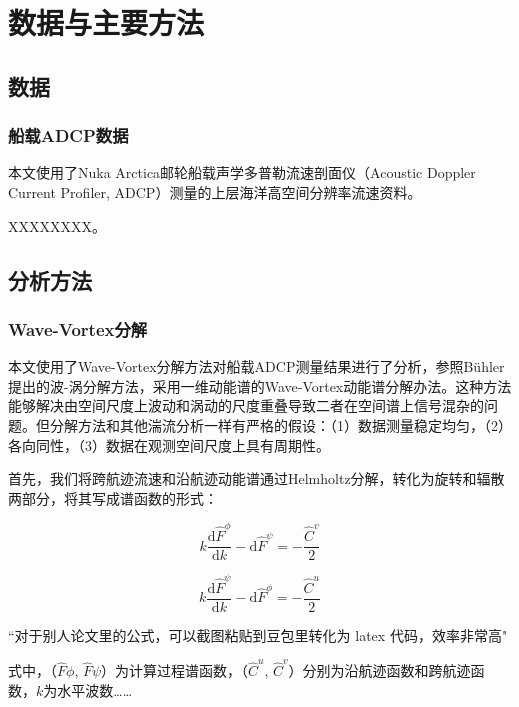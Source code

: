 \chapter{数据与主要方法}

\section{数据}

\subsection{船载ADCP数据}

本文使用了Nuka Arctica邮轮船载声学多普勒流速剖面仪（Acoustic Doppler Current Profiler, ADCP）测量的上层海洋高空间分辨率流速资料。

XXXXXXXX。

\section{分析方法}

\subsection{Wave-Vortex分解}

本文使用了Wave-Vortex分解方法对船载ADCP测量结果进行了分析，参照Bühler提出的波-涡分解方法，采用一维动能谱的Wave-Vortex动能谱分解办法。这种方法能够解决由空间尺度上波动和涡动的尺度重叠导致二者在空间谱上信号混杂的问题。但分解方法和其他湍流分析一样有严格的假设：（1）数据测量稳定均匀，（2）各向同性，（3）数据在观测空间尺度上具有周期性。

首先，我们将跨航迹流速和沿航迹动能谱通过Helmholtz分解，转化为旋转和辐散两部分，将其写成谱函数的形式：

\begin{equation}
k\frac{\mathrm{d}\widehat{F}^{\phi}}{\mathrm{d}k}-\mathrm{d}\widehat{F}^{\psi}=-\frac{\widehat{C}^{v}}{2}
\end{equation}

\begin{equation}
k\frac{\mathrm{d}\widehat{F}^{\psi}}{\mathrm{d}k}-\mathrm{d}\widehat{F}^{\phi}=-\frac{\widehat{C}^{u}}{2}
\end{equation}

{\color{red}``对于别人论文里的公式，可以截图粘贴到豆包里转化为 latex 代码，效率非常高"}

式中，（$\widehat{F}{\phi}$, $\widehat{F}{\psi}$）为计算过程谱函数，（$\widehat{C}^{u}$, $\widehat{C}^{v}$）分别为沿航迹函数和跨航迹函数，$k$为水平波数……




